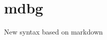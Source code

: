 \documentclass{report}
\begin{document}
\nocite{*}

\tableofcontents

\chapter{mdbg}
New syntax based on markdown
\end{document}
